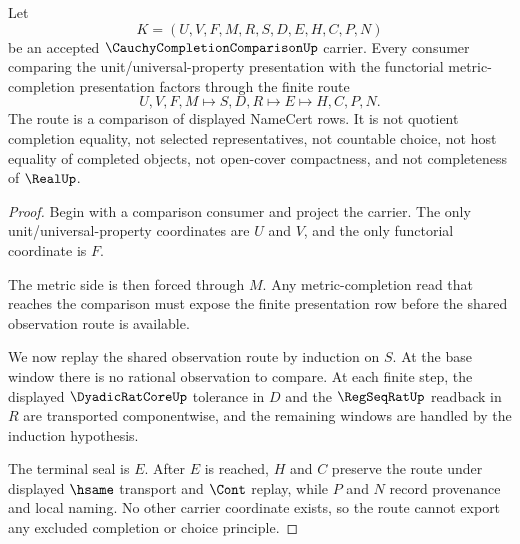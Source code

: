 \begin{theorem}
\label{thm:cauchy-completion-comparison-route}
Let
$$
K=(U,V,F,M,R,S,D,E,H,C,P,N)
$$
be an accepted $\CauchyCompletionComparisonUp$ carrier. Every consumer comparing the unit/universal-property presentation with the functorial metric-completion presentation factors through the finite route
$$
U,V,F,M\longmapsto S,D,R\longmapsto E\longmapsto H,C,P,N .
$$
The route is a comparison of displayed NameCert rows. It is not quotient completion equality, not selected representatives, not countable choice, not host equality of completed objects, not open-cover compactness, and not completeness of $\RealUp$.
\end{theorem}
\begin{proof}
Begin with a comparison consumer and project the carrier. The only unit/universal-property coordinates are $U$ and $V$, and the only functorial coordinate is $F$.

The metric side is then forced through $M$. Any metric-completion read that reaches the comparison must expose the finite presentation row before the shared observation route is available.

We now replay the shared observation route by induction on $S$. At the base window there is no rational observation to compare. At each finite step, the displayed $\DyadicRatCoreUp$ tolerance in $D$ and the $\RegSeqRatUp$ readback in $R$ are transported componentwise, and the remaining windows are handled by the induction hypothesis.

The terminal seal is $E$. After $E$ is reached, $H$ and $C$ preserve the route under displayed $\hsame$ transport and $\Cont$ replay, while $P$ and $N$ record provenance and local naming. No other carrier coordinate exists, so the route cannot export any excluded completion or choice principle.
\end{proof}

